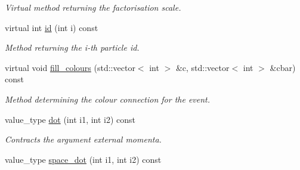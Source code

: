\begin{DoxyCompactItemize}
\begin{DoxyCompactList}\small\item\em Virtual method returning the factorisation scale. \end{DoxyCompactList}\item 
\hypertarget{a00451_a81a3eb4bfad1738c2a49c110d41e5c2a}{}virtual int \hyperlink{a00451_a81a3eb4bfad1738c2a49c110d41e5c2a}{id} (int i) const \label{a00451_a81a3eb4bfad1738c2a49c110d41e5c2a}

\begin{DoxyCompactList}\small\item\em Method returning the i-\/th particle id. \end{DoxyCompactList}\item 
\hypertarget{a00451_ae14bedd0a3ecec9e2c1509faeab471f6}{}virtual void \hyperlink{a00451_ae14bedd0a3ecec9e2c1509faeab471f6}{fill\+\_\+colours} (std\+::vector$<$ int $>$ \&c, std\+::vector$<$ int $>$ \&cbar) const \label{a00451_ae14bedd0a3ecec9e2c1509faeab471f6}

\begin{DoxyCompactList}\small\item\em Method determining the colour connection for the event. \end{DoxyCompactList}\item 
\hypertarget{a00451_a35962c48138ddc39e0316fbba1422583}{}value\+\_\+type \hyperlink{a00451_a35962c48138ddc39e0316fbba1422583}{dot} (int i1, int i2) const \label{a00451_a35962c48138ddc39e0316fbba1422583}

\begin{DoxyCompactList}\small\item\em Contracts the argument external momenta. \end{DoxyCompactList}\item 
\hypertarget{a00451_aaf3de6e8effefc030367eaa67a15c0dd}{}value\+\_\+type \hyperlink{a00451_aaf3de6e8effefc030367eaa67a15c0dd}{space\+\_\+dot} (int i1, int i2) const \label{a00451_aaf3de6e8effefc030367eaa67a15c0dd}


\end{DoxyCompactItemize}

